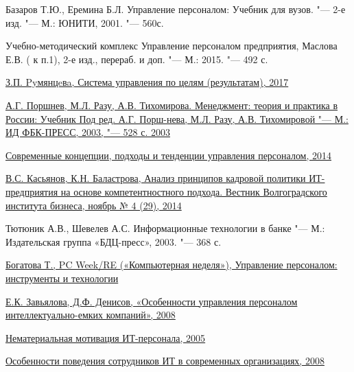 \documentclass{../industrial-development}
\begin{document}
\begin{thebibliography}{99}

 Базаров Т.Ю., Еремина Б.Л. Управление персоналом: Учебник для вузов. "--- 2-е изд. "--- М.: ЮНИТИ, 2001. "--- 560с.

 Учебно-методический комплекс Управление персоналом предприятия, Маслова Е.В. ( к п.1), 2-е изд., перераб. и доп. "--- М.: 2015. "--- 492 с.
 
 \href{
http://www.elitarium.ru/upravlenie-cel-rezultat-rukovoditel-zadacha-razvitie-plan-process-princip-metod-kontrol-polnomochiya-sistema/}{З.П. Pyмянцeвa, Система управления по целям (результатам), 2017}

 \href{http://scicenter.online/osnovy-menedjmenta-scicenter/upravlenie-posredstvom-motivatsii-41276.html}{
А.Г. Поршнев, М.Л. Разу, А.В. Тихомирова. Менеджмент: теория и практика в России: Учебник Под ред. А.Г. Порш-нева, М.Л. Разу, А.В. Тихомировой "--- М.: ИД ФБК-ПРЕСС, 2003, "--- 528 с. 2003}

 \href{http://www.hr-portal.ru/article/sovremennye-koncepcii-podhody-i-tendencii-upravleniya-personalom}{Современные концепции, подходы и тенденции управления персоналом, 2014}

 \href{http://vestnik.volbi.ru/upload/numbers/429/article-429-962.pdf}{В.С. Касьянов, К.Н. Баластрова, Анализ принципов кадровой политики ИТ-предприятия на основе компетентностного подхода. Вестник Волгоградского института бизнеса, ноябрь № 4 (29), 2014} 

 Тютюник А.В., Шевелев А.С. Информационные технологии в банке "--- М.: Издательская группа «БДЦ-пресс», 2003. "--- 368 с. 

 \href{https://www.itweek.ru/themes/detail.php?ID=73824}{Богатова Т., PC Week/RE («Компьютерная неделя»), Управление персоналом: инструменты и технологии}

 \href{https://cyberleninka.ru/article/v/osobennosti-upravleniya-personalom-intellektualno-emkih-kompaniy}{Е.К. Завьялова, Д.Ф. Денисов, «Особенности управления персоналом интеллектуально-емких компаний», 2008}

 \href{http://hr-portal.ru/article/nematerialnaya-motivaciya-it-personala
}{Нематериальная мотивация ИТ-персонала, 2005}


 \href{http://www.0ck.ru/menedzhment_i_trudovye_otnosheniya/osobennosti_povedeniya_sotrudnikov_it_v.html}{Особенности поведения сотрудников ИТ в современных организациях, 2008}


\end{thebibliography}
\end{document}
